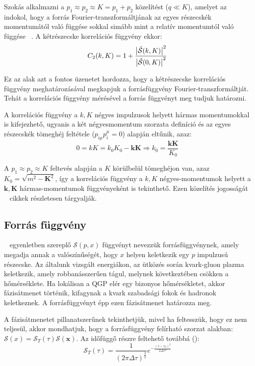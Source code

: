 \documentclass[11pt,a4paper]{article}
\numberwithin{equation}{subsection}
\numberwithin{figure}{section}
\begin{document}
Szokás alkalmazni a ${p_1}\approx {p_2}\approx {K} = p_1+p_2$ közelítést ($q\ll K$), amelyet az indokol, hogy a forrás Fourier-transzformáltjának az egyes részecskék momentumától való függése sokkal simább mint a relatív momentumtól való függése ~\cite{Lisa:2005dd}. A kétrészecske korrelációs függvény ekkor: 
\begin{equation}
C_2({k}, {K})=1+\frac{\abs{\tilde{\mathcal{S}}({k},{K})}^2}{\abs{\tilde{\mathcal{S}}(0,{K})}^2}
\label{eq:C02}
\end{equation}

Ez az alak azt a fontos üzenetet hordozza, hogy a kétrészecske korrelációs függvény meghatározásával megkapjuk a forrásfüggvény Fourier-transzformáltját. Tehát a korrelációs függvény mérésével a forrás függvényt meg tudjuk határozni. 


A korrelációs függvény a $k,K$ négyes impulzusok helyett hármas momentumokkal is kifejezhető, ugyanis a két négyesmomentum szorzata definíció és az egyes részecskék tömeghéj feltétele ($p_{i\mu}p^{\mu}_i=0$) alapján eltűnik, azaz:
\begin{equation}
0=kK=k_0K_0-\bm{kK}\Rightarrow k_0 = \frac{\bm{kK}}{K_0}
\label{eq:kK}
\end{equation}

A $p_1\approx p_2\approx K$ feltevés alapján a $K$ körülbelül tömeghéjon van, azaz $K_0 = \sqrt{m^2-\bm{K}^2}$, így a korrelációs függvény a $k,K$ négyes-momentumok helyett a $\bm{k},\bm{K}$ hármas-momentumok függvényeként is tekinthető. Ezen közelítés jogosságát ~\cite{Wiedemann:1999qn, Csorgo:1999sj} cikkek részletesen tárgyalják.

\subsection{Forrás függvény}
~ egyenletben szereplő $\mathcal{S}({p},{x})$ függvényt nevezzük forrásfüggvénynek, amely megadja annak a valószínűségét, hogy ${x}$ helyen keletkezik egy ${p}$ impulzusú részecske. Az általunk vizsgált energiákon, az ütközés során kvark-gluon plazma keletkezik, amely robbanásszerűen tágul, melynek következtében csökken a hőmérséklete. Ha lokálisan a QGP elér egy bizonyos hőmérsékletet, akkor fázisátmenet történik, kifagynak a kvark szabadsági fokok és hadronok keletkeznek. A forrásfüggvényt épp ezen fázisátmenet határozza meg. 

A fázisátmenetet pillanatszerűnek tekinthetjük, mivel ha feltesszük, hogy ez nem teljesül, akkor mondhatjuk, hogy a forrásfüggvény felírható szorzat alakban: $\mathcal{S}({x}) = \mathcal{S}_T(\tau)\mathcal{S}(\bm{x})$. Az időfüggő részre feltehető továbbá (\cite{CsanadHabil}):
\begin{equation}
\mathcal{S}_T(\tau)=\frac{1}{(2\pi \Delta\tau)^\frac{3}{2}}e^{-\frac{(\tau-\tau_0)^2}{2\Delta\tau^2}}
\end{equation}
\end{document}
